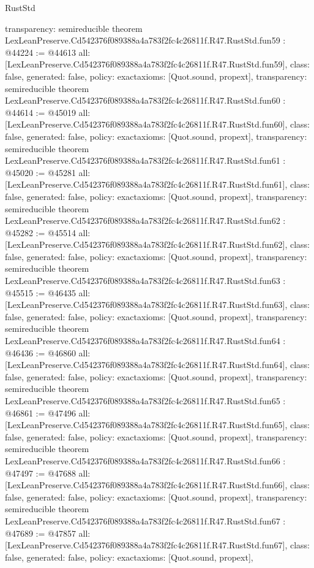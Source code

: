 \begin{lexlean}{RustStd}
\begin{coremodule}
{  transparency: semireducible
}
theorem LexLeanPreserve.Cd542376f089388a4a783f2fc4c26811f.R47.RustStd.fun59 : @44224 := @44613 {
  all: [LexLeanPreserve.Cd542376f089388a4a783f2fc4c26811f.R47.RustStd.fun59],
  class: false,
  generated: false,
  policy: exact{axioms: [Quot.sound, propext]},
  transparency: semireducible
}
theorem LexLeanPreserve.Cd542376f089388a4a783f2fc4c26811f.R47.RustStd.fun60 : @44614 := @45019 {
  all: [LexLeanPreserve.Cd542376f089388a4a783f2fc4c26811f.R47.RustStd.fun60],
  class: false,
  generated: false,
  policy: exact{axioms: [Quot.sound, propext]},
  transparency: semireducible
}
theorem LexLeanPreserve.Cd542376f089388a4a783f2fc4c26811f.R47.RustStd.fun61 : @45020 := @45281 {
  all: [LexLeanPreserve.Cd542376f089388a4a783f2fc4c26811f.R47.RustStd.fun61],
  class: false,
  generated: false,
  policy: exact{axioms: [Quot.sound, propext]},
  transparency: semireducible
}
theorem LexLeanPreserve.Cd542376f089388a4a783f2fc4c26811f.R47.RustStd.fun62 : @45282 := @45514 {
  all: [LexLeanPreserve.Cd542376f089388a4a783f2fc4c26811f.R47.RustStd.fun62],
  class: false,
  generated: false,
  policy: exact{axioms: [Quot.sound, propext]},
  transparency: semireducible
}
theorem LexLeanPreserve.Cd542376f089388a4a783f2fc4c26811f.R47.RustStd.fun63 : @45515 := @46435 {
  all: [LexLeanPreserve.Cd542376f089388a4a783f2fc4c26811f.R47.RustStd.fun63],
  class: false,
  generated: false,
  policy: exact{axioms: [Quot.sound, propext]},
  transparency: semireducible
}
theorem LexLeanPreserve.Cd542376f089388a4a783f2fc4c26811f.R47.RustStd.fun64 : @46436 := @46860 {
  all: [LexLeanPreserve.Cd542376f089388a4a783f2fc4c26811f.R47.RustStd.fun64],
  class: false,
  generated: false,
  policy: exact{axioms: [Quot.sound, propext]},
  transparency: semireducible
}
theorem LexLeanPreserve.Cd542376f089388a4a783f2fc4c26811f.R47.RustStd.fun65 : @46861 := @47496 {
  all: [LexLeanPreserve.Cd542376f089388a4a783f2fc4c26811f.R47.RustStd.fun65],
  class: false,
  generated: false,
  policy: exact{axioms: [Quot.sound, propext]},
  transparency: semireducible
}
theorem LexLeanPreserve.Cd542376f089388a4a783f2fc4c26811f.R47.RustStd.fun66 : @47497 := @47688 {
  all: [LexLeanPreserve.Cd542376f089388a4a783f2fc4c26811f.R47.RustStd.fun66],
  class: false,
  generated: false,
  policy: exact{axioms: [Quot.sound, propext]},
  transparency: semireducible
}
theorem LexLeanPreserve.Cd542376f089388a4a783f2fc4c26811f.R47.RustStd.fun67 : @47689 := @47857 {
  all: [LexLeanPreserve.Cd542376f089388a4a783f2fc4c26811f.R47.RustStd.fun67],
  class: false,
  generated: false,
  policy: exact{axioms: [Quot.sound, propext]},
}
\end{coremodule}
\end{lexlean}
